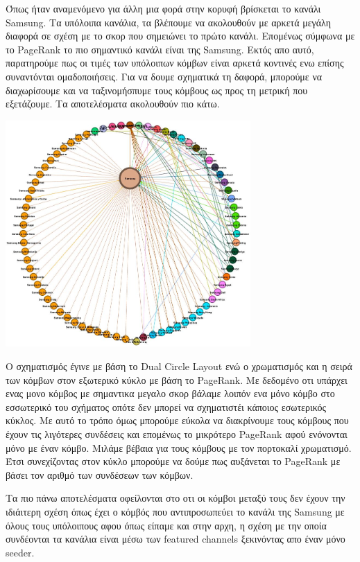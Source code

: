 \documentclass[12pt]{article}
\begin{document}
	\newpage
	Όπως ήταν αναμενόμενο για άλλη μια φορά στην κορυφή βρίσκεται το κανάλι Samsung. Τα υπόλοιπα κανάλια, τα βλέπουμε να ακολουθούν με αρκετά μεγάλη διαφορά σε σχέση με το σκορ που σημειώνει το πρώτο κανάλι. Επομένως σύμφωνα με το PageRank το πιο σημαντικό κανάλι είναι της Samsung. Εκτός απο αυτό, παρατηρούμε πως οι τιμές των υπόλοιπων κόμβων είναι αρκετά κοντινές ενω επίσης συναντόνται ομαδοποιήσεις. Για να δουμε σχηματικά τη δαφορά, μπορούμε να διαχωρίσουμε και να ταξινομήσπυμε τους κόμβους ως προς τη μετρική που εξετάζουμε. Τα αποτελέσματα ακολουθούν πιο κάτω.
	\vspace{12pt}
	\begin{center}
		\includegraphics[width=0.7\textwidth]{photos-files/section13/layout.JPG}
	\end{center}
	\vspace{12pt}
	Ο σχηματισμός έγινε με βάση το Dual Circle Layout ενώ ο χρωματισμός και η σειρά των κόμβων στον εξωτερικό κύκλο με βάση το PageRank. Με δεδομένο οτι υπάρχει ενας μονο κόμβος με σημαντικα μεγαλο σκορ βάλαμε λοιπόν ενα μόνο κόμβο στο εσσωτερικό του σχήματος οπότε δεν μπορεί να σχηματιστέι κάποιος εσωτερικός κύκλος. Με αυτό το τρόπο όμως μπορούμε εύκολα να διακρίνουμε τους κόμβους που έχουν τις λιγότερες συνδέσεις και επομένως το μικρότερο PageRank αφού ενόνονται μόνο με έναν κόμβο. Μιλάμε βέβαια για τους κόμβους με τον πορτοκαλί χρωματισμό. Έτσι συνεχίζοντας στον κύκλο μπορούμε να δούμε πως αυξάνεται το PageRank με βάσει τον αριθμό των συνδέσεων των κόμβων.
	
	Τα πιο πάνω αποτελέσματα οφείλονται στο οτι οι κόμβοι μεταξύ τους δεν έχουν την ιδιάιτερη σχέση όπως έχει ο κόμβός που αντιπροσωπεύει το κανάλι της Samsung με όλους τους υπόλοιπους αφου όπως είπαμε και στην αρχη, η σχέση με την οποία συνδέονται τα κανάλια είναι μέσω των featured channels ξεκινόντας απο έναν μόνο seeder.
	\label{chap:PageRank_13}
	
\end{document}
